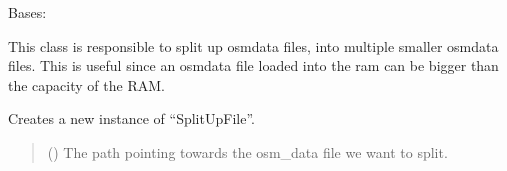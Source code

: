 \documentclass[letterpaper,10pt,english]{sphinxmanual}
\begin{document}
\begin{fulllineitems}
\label{\detokenize{apidoc/src.osm_configurator.model.project.calculation:src.osm_configurator.model.project.calculation.split_up_files.SplitUpFile}}
\pysigstartsignatures
{}
\pysigstopsignatures
\sphinxAtStartPar
Bases: 

\sphinxAtStartPar
This class is responsible to split up osm\sphinxhyphen{}data files, into multiple smaller osm\sphinxhyphen{}data files.
This is useful since an osm\sphinxhyphen{}data file loaded into the ram can be bigger than the capacity of the RAM.

\begin{fulllineitems}
\label{\detokenize{apidoc/src.osm_configurator.model.project.calculation:src.osm_configurator.model.project.calculation.split_up_files.SplitUpFile.__init__}}
\pysigstartsignatures
{}
\pysigstopsignatures
\sphinxAtStartPar
Creates a new instance of “SplitUpFile”.
\begin{quote}\begin{description}
\sphinxAtStartPar
{} () \textendash{} The path pointing towards the osm\_data file we want to split.

\end{description}\end{quote}

\end{fulllineitems}



\end{fulllineitems}
\end{document}
